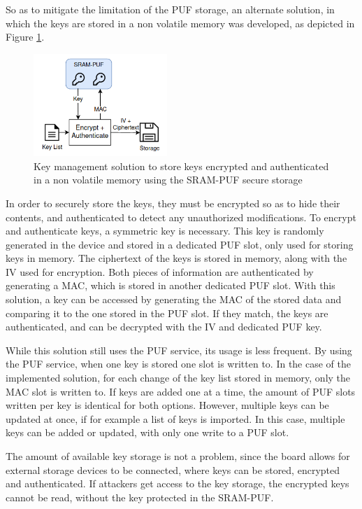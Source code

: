 So as to mitigate the limitation of the PUF storage, an alternate solution, in which the keys are stored in a non volatile memory was developed, as depicted in Figure \ref{fig:implementation:key-management}.
\begin{figure}[h!]
	\centering
	\includegraphics[width=0.45\textwidth]{./Images/key-management.png}
	\caption{Key management solution to store keys encrypted and authenticated in a non volatile memory using the SRAM-PUF secure storage}
	\label{fig:implementation:key-management}
\end{figure}
In order to securely store the keys, they must be encrypted so as to hide their contents, and authenticated to detect any unauthorized modifications.
To encrypt and authenticate keys, a symmetric key is necessary. This key is randomly generated in the device and stored in a dedicated PUF slot, only used for storing keys in memory.
The ciphertext of the keys is stored in memory, along with the IV used for encryption.
Both pieces of information are authenticated by generating a MAC, which is stored in another dedicated PUF slot.
With this solution, a key can be accessed by generating the MAC of the stored data and comparing it to the one stored in the PUF slot. If they match, the keys are authenticated, and can be decrypted with the IV and dedicated PUF key.

While this solution still uses the PUF service, its usage is less frequent. By using the PUF service, when one key is stored one slot is written to.
In the case of the implemented solution, for each change of the key list stored in memory, only the MAC slot is written to.
If keys are added one at a time, the amount of PUF slots written per key is identical for both options. However, multiple keys can be updated at once, if for example a list of keys is imported. In this case, multiple keys can be added or updated, with only one write to a PUF slot.

The amount of available key storage is not a problem, since the board allows for external storage devices to be connected, where keys can be stored, encrypted and authenticated. If attackers get access to the key storage, the encrypted keys cannot be read, without the key protected in the SRAM-PUF.

